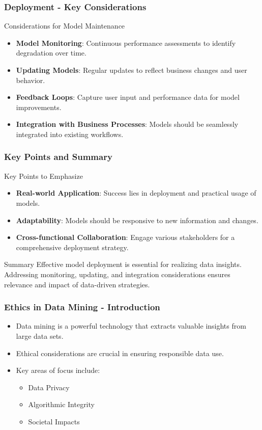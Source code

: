 \documentclass[aspectratio=169]{beamer}
\begin{document}
\begin{frame}[fragile]
    \frametitle{Deployment - Key Considerations}
    \begin{block}{Considerations for Model Maintenance}
        \begin{itemize}
            \item \textbf{Model Monitoring}: Continuous performance assessments to identify degradation over time.
            \item \textbf{Updating Models}: Regular updates to reflect business changes and user behavior.
            \item \textbf{Feedback Loops}: Capture user input and performance data for model improvements.
            \item \textbf{Integration with Business Processes}: Models should be seamlessly integrated into existing workflows.
        \end{itemize}
    \end{block}
\end{frame}

\begin{frame}[fragile]
    \frametitle{Key Points and Summary}
    \begin{block}{Key Points to Emphasize}
        \begin{itemize}
            \item \textbf{Real-world Application}: Success lies in deployment and practical usage of models.
            \item \textbf{Adaptability}: Models should be responsive to new information and changes.
            \item \textbf{Cross-functional Collaboration}: Engage various stakeholders for a comprehensive deployment strategy.
        \end{itemize}
    \end{block}
    \begin{block}{Summary}
        Effective model deployment is essential for realizing data insights. Addressing monitoring, updating, and integration considerations ensures relevance and impact of data-driven strategies.
    \end{block}
\end{frame}

\begin{frame}[fragile]
    \frametitle{Ethics in Data Mining - Introduction}
    \begin{itemize}
        \item Data mining is a powerful technology that extracts valuable insights from large data sets.
        \item Ethical considerations are crucial in ensuring responsible data use.
        \item Key areas of focus include:
            \begin{itemize}
                \item Data Privacy
                \item Algorithmic Integrity
                \item Societal Impacts
            \end{itemize}
    \end{itemize}
\end{frame}
\end{document}

